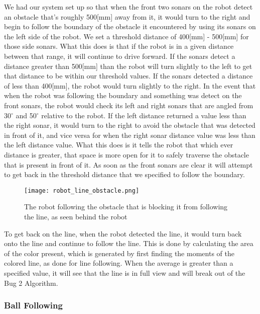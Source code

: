 \documentclass[12pt]{article}
\begin{document}
We had our system set up so that when the front two sonars on the robot detect an obstacle that's roughly 500[mm] away from it, it would turn to the right and begin to follow the boundary of the obstacle it encountered by using its sonars on the left side of the robot. We set a threshold distance of 400[mm] - 500[mm] for those side sonars. What this does is that if the robot is in a given distance between that range, it will continue to drive forward. If the sonars detect a distance greater than 500[mm] than the robot will turn slightly to the left to get that distance to be within our threshold values. If the sonars detected a distance of less than 400[mm], the robot would turn slightly to the right. In the event that when the robot was following the boundary and something was detect on the front sonars, the robot would check its left and right sonars that are angled from 30$^\circ$ and 50$^\circ$ relative to the robot. If the left distance returned a value less than the right sonar, it would turn to the right to avoid the obstacle that was detected in front of it, and vice versa for when the right sonar distance value was less than the left distance value. What this does is it tells the robot that which ever distance is greater, that space is more open for it to safely traverse the obstacle that is present in front of it. As soon as the front sonars are clear it will attempt to get back in the threshold distance that we specified to follow the boundary.

\begin{figure}[htp!]
	\begin{center}
		\texttt{[image: robot\_line\_obstacle.png]}
		\caption{The robot following the obstacle that is blocking it from following the line, as seen behind the robot}
	\end{center}
\end{figure}

To get back on the line, when the robot detected the line, it would turn back onto the line and continue to follow the line. This is done by calculating the area of the color present, which is generated by first finding the moments of the colored line, as done for line following. When the average is greater than a specified value, it will see that the line is in full view and will break out of the Bug 2 Algorithm.


\subsubsection{Ball Following} \label{sec:ball}
\end{document}
